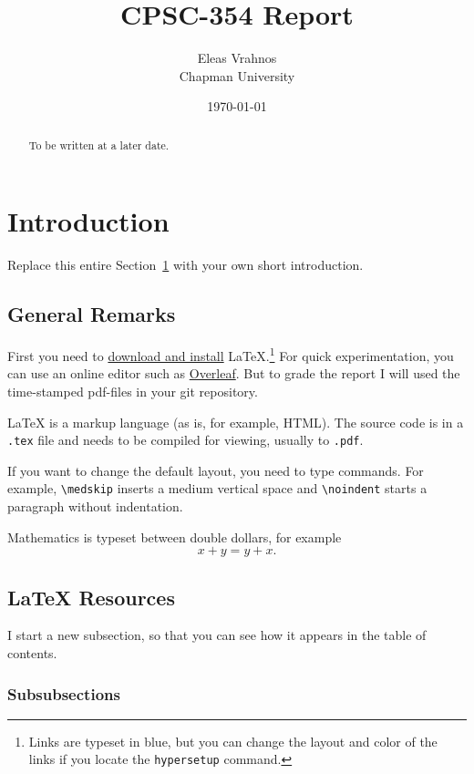 \documentclass{article}
\title{CPSC-354 Report}
\author{Eleas Vrahnos  \\ Chapman University}
\date{\today}
\theoremstyle{theorem}
\theoremstyle{definition}
\theoremstyle{remark}
\begin{document}
\maketitle

\begin{abstract}
To be written at a later date. 
\end{abstract}

\tableofcontents

\section{Introduction}\label{intro}

Replace this entire Section~\ref{intro} with your own short introduction. 

\subsection{General Remarks}

First you need to \href{https://www.latex-project.org/get/}{download and install} LaTeX.\footnote{Links are typeset in blue, but you can change the layout and color of the links if you locate the  \texttt{hypersetup} command.}
%
For quick experimentation, you can use an online editor such as \href{https://www.overleaf.com/learn}{Overleaf}. But to grade the report I will used the time-stamped pdf-files in your git repository.  

 
\medskip\noindent
LaTeX is a markup language (as is, for example, HTML). The source code is in a \verb+.tex+ file and needs to be compiled for viewing, usually to \verb+.pdf+.


\medskip\noindent
If you want to change the default layout, you need to type commands. For example, \verb+\medskip+ inserts a medium vertical space and \verb+\noindent+ starts a paragraph without indentation.
 
\medskip\noindent
Mathematics is typeset between double dollars, for example $$x+y=y+x.$$


\subsection{LaTeX Resources}

I start a new subsection, so that you can see how it appears in the table of contents.

\subsubsection{Subsubsections}
\end{document}

